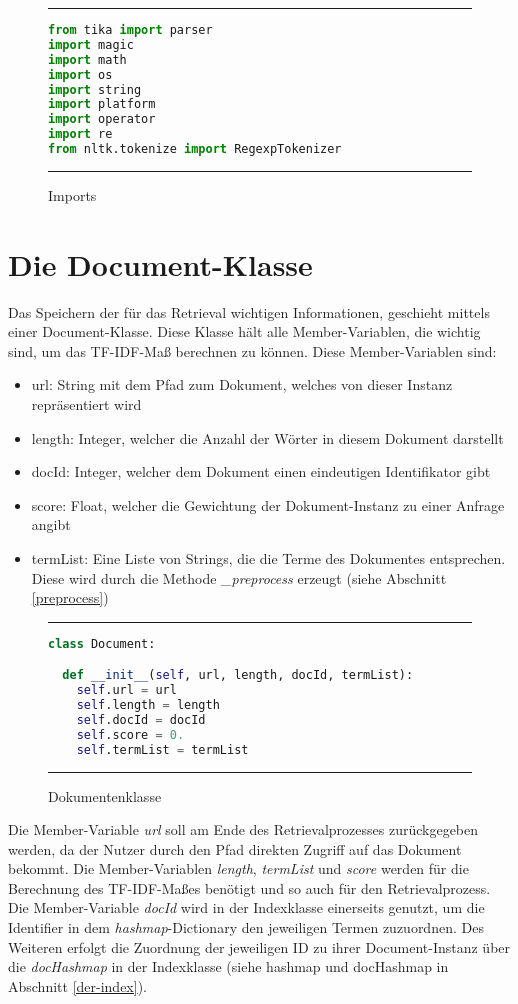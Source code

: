 \begin{figure}[h]
	\rule{\textwidth}{0.4pt}
		\begin{lstlisting}[language=Python]
from tika import parser
import magic
import math
import os
import string
import platform
import operator
import re
from nltk.tokenize import RegexpTokenizer
		\end{lstlisting}
	\rule{\textwidth}{0.4pt}
	\caption{Imports}
	\label{fig:import}
\end{figure}

\section{Die Document-Klasse}\label{die-document-klasse}

Das Speichern der für das Retrieval wichtigen Informationen, geschieht mittels einer Document-Klasse. Diese Klasse hält alle Member-Variablen, die wichtig sind, um das TF-IDF-Maß berechnen zu können. Diese Member-Variablen sind:
\begin{itemize}
	\item url: String mit dem Pfad zum Dokument, welches von dieser Instanz repräsentiert wird
	\item length: Integer, welcher die Anzahl der Wörter in diesem Dokument darstellt
	\item docId: Integer, welcher dem Dokument einen eindeutigen Identifikator gibt
	\item score: Float, welcher die Gewichtung der Dokument-Instanz zu einer Anfrage angibt
	\item termList: Eine Liste von Strings, die die Terme des Dokumentes entsprechen. Diese wird durch die Methode \textit{\_preprocess} erzeugt (siehe Abschnitt \ref{preprocess})
\end{itemize} 

\begin{figure}[h]
	\rule{\textwidth}{0.4pt}
		\begin{lstlisting}[language=Python]
class Document:

  def __init__(self, url, length, docId, termList):
    self.url = url
    self.length = length
    self.docId = docId
    self.score = 0.
    self.termList = termList
		\end{lstlisting}
	\rule{\textwidth}{0.4pt}
	\caption{Dokumentenklasse}
	\label{fig:document}
\end{figure}

Die Member-Variable \textit{url} soll am Ende des Retrievalprozesses zurückgegeben werden, da der Nutzer durch den Pfad direkten Zugriff auf das Dokument bekommt. Die Member-Variablen \textit{length}, \textit{termList} und \textit{score} werden für die Berechnung des TF-IDF-Maßes benötigt und so auch für den Retrievalprozess. Die Member-Variable \textit{docId} wird in der Indexklasse einerseits genutzt, um die Identifier in dem \textit{hashmap}-Dictionary den jeweiligen Termen zuzuordnen. Des Weiteren erfolgt die Zuordnung der jeweiligen ID zu ihrer Document-Instanz über die \textit{docHashmap} in der Indexklasse (siehe hashmap und docHashmap in Abschnitt \ref{der-index}).

